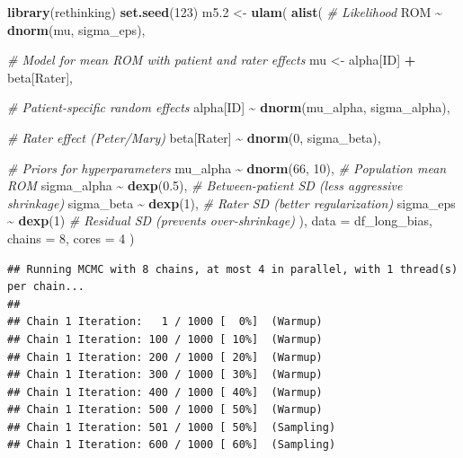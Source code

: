\documentclass[
]{book}
\newenvironment{Shaded}{\begin{snugshade}}{\end{snugshade}}
\newcommand{\AttributeTok}[1]{\textcolor[rgb]{0.13,0.29,0.53}{#1}}
\newcommand{\CommentTok}[1]{\textcolor[rgb]{0.56,0.35,0.01}{\textit{#1}}}
\newcommand{\DecValTok}[1]{\textcolor[rgb]{0.00,0.00,0.81}{#1}}
\newcommand{\FloatTok}[1]{\textcolor[rgb]{0.00,0.00,0.81}{#1}}
\newcommand{\FunctionTok}[1]{\textcolor[rgb]{0.13,0.29,0.53}{\textbf{#1}}}
\newcommand{\NormalTok}[1]{#1}
\newcommand{\OtherTok}[1]{\textcolor[rgb]{0.56,0.35,0.01}{#1}}
\newcommand{\SpecialCharTok}[1]{\textcolor[rgb]{0.81,0.36,0.00}{\textbf{#1}}}
\begin{document}
\begin{Shaded}
\begin{Highlighting}[]
\FunctionTok{library}\NormalTok{(rethinking)}
\FunctionTok{set.seed}\NormalTok{(}\DecValTok{123}\NormalTok{)}
\NormalTok{m5}\FloatTok{.2} \OtherTok{\textless{}{-}} \FunctionTok{ulam}\NormalTok{(}
  \FunctionTok{alist}\NormalTok{(}
    \CommentTok{\# Likelihood}
\NormalTok{    ROM }\SpecialCharTok{\textasciitilde{}} \FunctionTok{dnorm}\NormalTok{(mu, sigma\_eps),}
    
    \CommentTok{\# Model for mean ROM with patient and rater effects}
\NormalTok{    mu }\OtherTok{\textless{}{-}}\NormalTok{ alpha[ID] }\SpecialCharTok{+}\NormalTok{ beta[Rater],  }
    
    \CommentTok{\# Patient{-}specific random effects}
\NormalTok{    alpha[ID] }\SpecialCharTok{\textasciitilde{}} \FunctionTok{dnorm}\NormalTok{(mu\_alpha, sigma\_alpha),  }
    
    \CommentTok{\# Rater effect (Peter/Mary)}
\NormalTok{    beta[Rater] }\SpecialCharTok{\textasciitilde{}} \FunctionTok{dnorm}\NormalTok{(}\DecValTok{0}\NormalTok{, sigma\_beta),  }
    
    \CommentTok{\# Priors for hyperparameters}
\NormalTok{    mu\_alpha }\SpecialCharTok{\textasciitilde{}} \FunctionTok{dnorm}\NormalTok{(}\DecValTok{66}\NormalTok{, }\DecValTok{10}\NormalTok{),  }\CommentTok{\# Population mean ROM}
\NormalTok{    sigma\_alpha }\SpecialCharTok{\textasciitilde{}} \FunctionTok{dexp}\NormalTok{(}\FloatTok{0.5}\NormalTok{),  }\CommentTok{\# Between{-}patient SD (less aggressive shrinkage)}
\NormalTok{    sigma\_beta }\SpecialCharTok{\textasciitilde{}} \FunctionTok{dexp}\NormalTok{(}\DecValTok{1}\NormalTok{),   }\CommentTok{\# Rater SD (better regularization)}
\NormalTok{    sigma\_eps }\SpecialCharTok{\textasciitilde{}} \FunctionTok{dexp}\NormalTok{(}\DecValTok{1}\NormalTok{)     }\CommentTok{\# Residual SD (prevents over{-}shrinkage)}
\NormalTok{  ), }
  \AttributeTok{data =}\NormalTok{ df\_long\_bias, }
  \AttributeTok{chains =} \DecValTok{8}\NormalTok{, }\AttributeTok{cores =} \DecValTok{4}
\NormalTok{)}
\end{Highlighting}
\end{Shaded}

\begin{verbatim}
## Running MCMC with 8 chains, at most 4 in parallel, with 1 thread(s) per chain...
## 
## Chain 1 Iteration:   1 / 1000 [  0%]  (Warmup) 
## Chain 1 Iteration: 100 / 1000 [ 10%]  (Warmup) 
## Chain 1 Iteration: 200 / 1000 [ 20%]  (Warmup) 
## Chain 1 Iteration: 300 / 1000 [ 30%]  (Warmup) 
## Chain 1 Iteration: 400 / 1000 [ 40%]  (Warmup) 
## Chain 1 Iteration: 500 / 1000 [ 50%]  (Warmup) 
## Chain 1 Iteration: 501 / 1000 [ 50%]  (Sampling) 
## Chain 1 Iteration: 600 / 1000 [ 60%]  (Sampling)
\end{verbatim}
\end{document}
